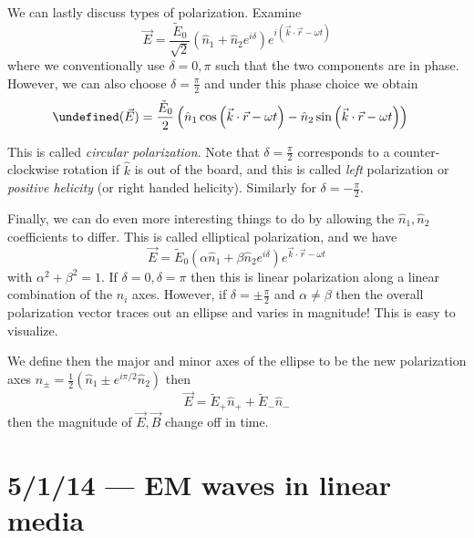 \documentclass[10pt]{report}
\let\Re\undefined
\DeclareMathOperator{\Re}{Re}
\begin{document}
We can lastly discuss types of polarization. Examine
\begin{equation}
    \vec{E} = \frac{\tilde{E}_0}{\sqrt{2}}\left( \hat{n}_1 + \hat{n}_2e^{i\delta} \right)e^{i(\vec{k} \cdot \vec{r} - \omega t)}
\end{equation}
where we conventionally use $\delta = 0,\pi$ such that the two components are in phase. However, we can also choose $\delta = \frac{\pi}{2}$ and under this phase choice we obtain
\begin{align}
    \Re(\vec{E}) &= \frac{\tilde{E}_0}{2}\left( \hat{n}_1 \cos \left( \vec{k} \cdot \vec{r} - \omega t \right)  - \hat{n}_2 \sin \left( \vec{k} \cdot \vec{r} - \omega t \right)\right)
\end{align}

This is called \emph{circular polarization}. Note that $\delta = \frac{\pi}{2}$ corresponds to a counter-clockwise rotation if $\hat{k}$ is out of the board, and this is called \emph{left} polarization or \emph{positive helicity} (or right handed helicity). Similarly for $\delta = -\frac{\pi}{2}$.

Finally, we can do even more interesting things to do by allowing the $\hat{n}_1, \hat{n}_2$ coefficients to differ. This is called elliptical polarization, and we have
\begin{equation}
    \vec{E} = \tilde{E}_0\left( \alpha \hat{n}_1 + \beta \hat{n}_2e^{i\delta} \right)e^{\vec{k} \cdot \vec{r} - \omega t}
\end{equation}
with $\alpha^2 + \beta^2 = 1$. If $\delta = 0, \delta = \pi$ then this is linear polarization along a linear combination of the $\hat{n}_i$ axes. However, if $\delta = \pm \frac{\pi}{2}$ and $\alpha \neq \beta$ then the overall polarization vector traces out an ellipse and varies in magnitude! This is easy to visualize.

We define then the major and minor axes of the ellipse to be the new polarization axes $\hat{n}_{\pm} = \frac{1}{2}\left( \hat{n}_1 \pm e^{i\pi/2}\hat{n}_2 \right)$ then
\begin{equation}
    \vec{E} = \tilde{E}_+ \hat{n}_+ + \tilde{E}_- \hat{n}_-
\end{equation}
then the magnitude of $\vec{E}, \vec{B}$ change off in time.

\chapter{5/1/14 --- EM waves in linear media}
\end{document}
